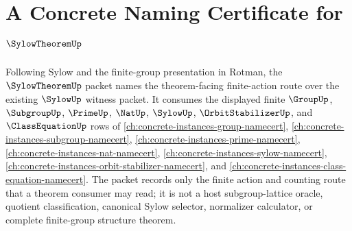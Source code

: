\chapter{A Concrete Naming Certificate for $\SylowTheoremUp$}
\label{ch:concrete-instances-sylow-theorem-namecert}

Following Sylow and the finite-group presentation in Rotman, the $\SylowTheoremUp$ packet names the theorem-facing finite-action route over the existing $\SylowUp$ witness packet. It consumes the displayed finite $\GroupUp$, $\SubgroupUp$, $\PrimeUp$, $\NatUp$, $\SylowUp$, $\OrbitStabilizerUp$, and $\ClassEquationUp$ rows of \autoref{ch:concrete-instances-group-namecert}, \autoref{ch:concrete-instances-subgroup-namecert}, \autoref{ch:concrete-instances-prime-namecert}, \autoref{ch:concrete-instances-nat-namecert}, \autoref{ch:concrete-instances-sylow-namecert}, \autoref{ch:concrete-instances-orbit-stabilizer-namecert}, and \autoref{ch:concrete-instances-class-equation-namecert}. The packet records only the finite action and counting route that a theorem consumer may read; it is not a host subgroup-lattice oracle, quotient classification, canonical Sylow selector, normalizer calculator, or complete finite-group structure theorem.

